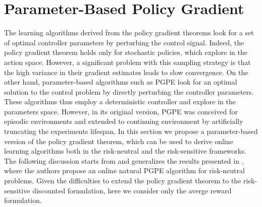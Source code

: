 \chapter{Parameter-Based Policy Gradient}
\label{ch:parameter_based_policy_gradient}

The learning algorithms derived from the policy gradient theorems look for a set of optimal controller parameters by perturbing the control signal. Indeed, the policy gradient theorem holds only for stochastic policies, which explore in the action space.
However, a significant problem with this sampling strategy is that the high variance in their gradient estimates leads to slow convergence. On the other hand, parameter-based algorithms such as PGPE look for an optimal solution to the control problem by directly perturbing the controller parameters. These algorithms thus employ a deterministic controller and explore in the parameters space. However, in its original version, PGPE was conceived for episodic environments and extended to continuing environment by artificially truncating the experiments lifespan. In this section we propose a parameter-based version of the policy gradient theorem, which can be used to derive online learning algorithms both in the risk-neutral and the risk-sensitive frameworks. The following discussion starts from and generalizes the results presented in \cite{miyamae2010natural}, where the authors propose an online natural PGPE algorithm for risk-neutral problems. Given the difficulties to extend the policy gradient theorem to the risk-sensitive discounted formulation, here we consider only the averge reward formulation. 

